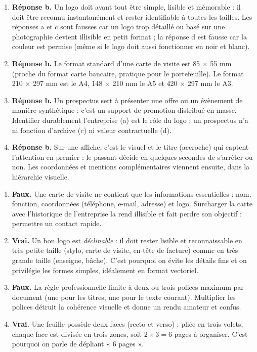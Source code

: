 \documentclass[11pt]{article}
\newcommand{\cle}[1]{{\popxbold\color{popdark}#1}}
\begin{document}
\begin{corrige}
\begin{enumerate}
\item \textbf{Réponse b.} Un logo doit avant tout être \cle{simple, lisible et mémorable} : il doit être reconnu instantanément et rester identifiable à toutes les tailles. Les réponses a et c sont fausses car un logo trop détaillé ou basé sur une photographie devient illisible en petit format ; la réponse d est fausse car la couleur est permise (même si le logo doit aussi fonctionner en noir et blanc).
\item \textbf{Réponse b.} Le format standard d'une carte de visite est \cle{85 $\times$ 55 mm} (proche du format carte bancaire, pratique pour le portefeuille). Le format 210 $\times$ 297 mm est le A4, 148 $\times$ 210 mm le A5 et 420 $\times$ 297 mm le A3.
\item \textbf{Réponse b.} Un prospectus sert à \cle{présenter une offre ou un évènement de manière synthétique} : c'est un support de promotion distribué en masse. Identifier durablement l'entreprise (a) est le rôle du logo ; un prospectus n'a ni fonction d'archive (c) ni valeur contractuelle (d).
\item \textbf{Réponse b.} Sur une affiche, c'est \cle{le visuel et le titre (accroche)} qui captent l'attention en premier : le passant décide en quelques secondes de s'arrêter ou non. Les coordonnées et mentions complémentaires viennent ensuite, dans la hiérarchie visuelle.
\end{enumerate}
\end{corrige}

\begin{corrige}
\begin{enumerate}
\item \textbf{Faux.} Une carte de visite ne contient que les informations essentielles : nom, fonction, coordonnées (téléphone, e-mail, adresse) et logo. Surcharger la carte avec l'historique de l'entreprise la rend illisible et fait perdre son objectif : permettre un contact rapide.
\item \textbf{Vrai.} Un bon logo est \emph{déclinable} : il doit rester lisible et reconnaissable en très petite taille (stylo, carte de visite, en-tête de facture) comme en très grande taille (enseigne, bâche). C'est pourquoi on évite les détails fins et on privilégie les formes simples, idéalement en format vectoriel.
\item \textbf{Faux.} La règle professionnelle limite à \cle{deux ou trois polices} maximum par document (une pour les titres, une pour le texte courant). Multiplier les polices détruit la cohérence visuelle et donne un rendu amateur et confus.
\item \textbf{Vrai.} Une feuille possède deux faces (recto et verso) ; pliée en trois volets, chaque face est divisée en trois zones, soit $2 \times 3 = 6$ pages à organiser. C'est pourquoi on parle de dépliant « 6 pages ».
\end{enumerate}
\end{corrige}
\end{document}
